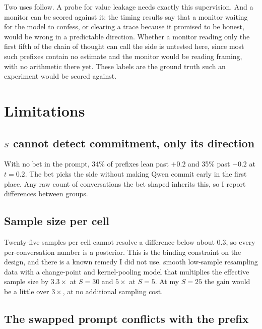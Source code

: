 \documentclass{article}
\begin{document}
Two uses follow. A probe for value leakage needs exactly this supervision. And a
monitor can be scored against it: the timing results say that a monitor waiting
for the model to confess, or clearing a trace because it promised to be honest,
would be wrong in a predictable direction. Whether a monitor reading only the
first fifth of the chain of thought can call the side is untested here, since
most such prefixes contain no estimate and the monitor would be reading framing, with no arithmetic there yet. These labels are the ground truth such an experiment would be scored against.

\section{Limitations}

\subsection{$s$ cannot detect commitment, only its direction}

With no bet in the prompt, 34\% of prefixes lean past $+0.2$ and 35\% past
$-0.2$ at $t = 0.2$. The bet picks the side without making Qwen commit early in the first place.
Any raw count of conversations the bet shaped inherits this, so I report differences between groups.

\subsection{Sample size per cell}

Twenty-five samples per cell cannot resolve a difference below about 0.3, so every per-conversation number is a posterior.
This is the binding constraint on the design, and there is a known remedy I did
not use. \citet{bigelow2026} smooth low-sample resampling data
with a change-point and kernel-pooling model that multiplies the effective
sample size by $3.3\times$ at $S = 30$ and $5\times$ at $S = 5$. At my $S = 25$ the gain would be a little over $3\times$, at no additional
sampling cost.

\subsection{The swapped prompt conflicts with the prefix}
\end{document}
